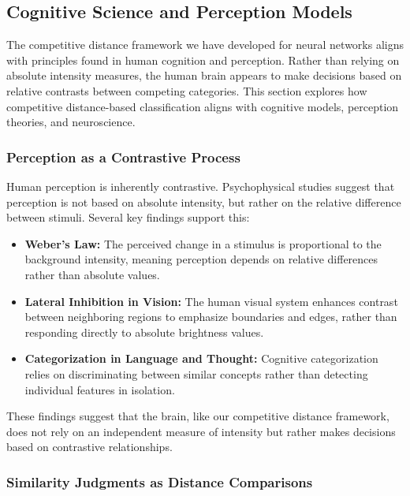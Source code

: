 \subsection{Cognitive Science and Perception Models}

The competitive distance framework we have developed for neural networks aligns with principles found in human cognition and perception. Rather than relying on absolute intensity measures, the human brain appears to make decisions based on relative contrasts between competing categories. This section explores how competitive distance-based classification aligns with cognitive models, perception theories, and neuroscience.

\subsubsection{Perception as a Contrastive Process}

Human perception is inherently contrastive. Psychophysical studies suggest that perception is not based on absolute intensity, but rather on the relative difference between stimuli. Several key findings support this:

\begin{itemize}
    \item \textbf{Weber’s Law:} The perceived change in a stimulus is proportional to the background intensity, meaning perception depends on relative differences rather than absolute values.
    \item \textbf{Lateral Inhibition in Vision:} The human visual system enhances contrast between neighboring regions to emphasize boundaries and edges, rather than responding directly to absolute brightness values.
    \item \textbf{Categorization in Language and Thought:} Cognitive categorization relies on discriminating between similar concepts rather than detecting individual features in isolation.
\end{itemize}

These findings suggest that the brain, like our competitive distance framework, does not rely on an independent measure of intensity but rather makes decisions based on contrastive relationships.

\subsubsection{Similarity Judgments as Distance Comparisons}

